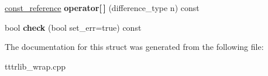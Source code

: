 \begin{DoxyCompactItemize}
\item 
\mbox{\label{structswig_1_1_swig_py_sequence___cont_a33b8b37c909c48bc894cd9b909d1e81d}} 
\hyperlink{structswig_1_1_swig_py_sequence___ref}{const\+\_\+reference} {\bfseries operator\mbox{[}$\,$\mbox{]}} (difference\+\_\+type n) const
\item 
\mbox{\label{structswig_1_1_swig_py_sequence___cont_adde81d1400800d54b6a8cd0afd234438}} 
bool {\bfseries check} (bool set\+\_\+err=true) const
\end{DoxyCompactItemize}


The documentation for this struct was generated from the following file\+:\begin{DoxyCompactItemize}
\item 
tttrlib\+\_\+wrap.\+cpp\end{DoxyCompactItemize}
